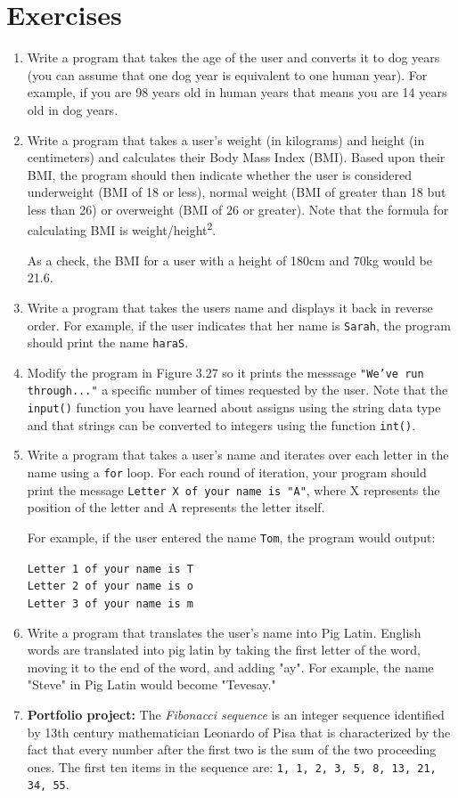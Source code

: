 \documentclass{book}
\begin{document}
\section{Exercises}
\begin{enumerate}
	\item Write a program that takes the age of the user and converts it to dog years (you can assume that one dog year is equivalent to one human year). For example, if you are 98 years old in human years that means you are 14 years old in dog years.
	\item Write a program that takes a user's weight (in kilograms) and height (in centimeters) and calculates their Body Mass Index (BMI). Based upon their BMI, the program should then indicate whether the user is considered underweight (BMI of 18 or less), normal weight (BMI of greater than 18 but less than 26) or overweight (BMI of 26 or greater). Note that the formula for calculating BMI is weight/height\textsuperscript{2}.
	
	As a check, the BMI for a user with a height of 180cm and 70kg would be 21.6.
	\item Write a program that takes the users name and displays it back in reverse order. For example, if the user indicates that her name is \texttt{Sarah}, the program should print the name \texttt{haraS}.
	\item Modify the program in Figure 3.27 so it prints the messsage \texttt{"We've run through..."} a specific number of times requested by the user. Note that the \texttt{input()} function you have learned about assigns using the string data type and that strings can be converted to integers using the function \texttt{int()}.
	\item Write a program that takes a user's name and iterates over each letter in the name using a \texttt{for} loop. For each round of iteration, your program should print the message \texttt{Letter X of your name is "A"}, where X represents the position of the letter and A represents the letter itself.
	
	For example, if the user entered the name \texttt{Tom}, the program would output:
	
	\texttt{Letter 1 of your name is T\\Letter 2 of your name is o\\Letter 3 of your name is m}
	\item Write a program that translates the user's name into Pig Latin. English words are translated into pig latin by taking the first letter of the word, moving it to the end of the word, and adding "ay". For example, the name "Steve" in Pig Latin would become "Tevesay."
	\item \textbf{Portfolio project:} The \textit{Fibonacci sequence} is an integer sequence identified by 13th century mathematician Leonardo of Pisa that is characterized by the fact that every number after the first two is the sum of the two proceeding ones. The first ten items in the sequence are: \texttt{1, 1, 2, 3, 5, 8, 13, 21, 34, 55}.
	

\end{enumerate}
\end{document}
